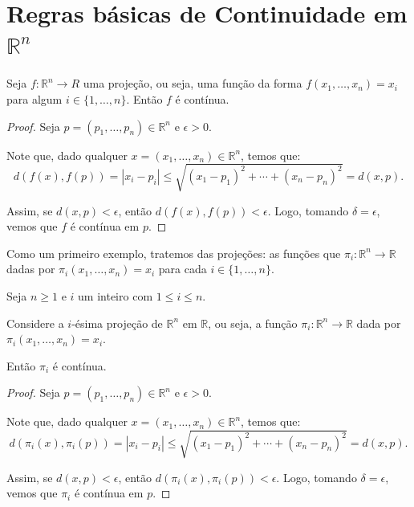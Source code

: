 \section{Regras básicas de Continuidade em $\mathbb R^n$}


\begin{proposition}
    Seja $f: \mathbb R^n\rightarrow R$ uma projeção, ou seja, uma função da forma $f(x_1, \dots, x_n) = x_i$ para algum $i \in \{1, \dots, n\}$.
    Então $f$ é contínua.
\end{proposition}
\begin{proof}
    Seja $p=(p_1, \dots, p_n) \in \mathbb R^n$ e $\epsilon>0$.

    Note que, dado qualquer $x=(x_1, \dots, x_n) \in \mathbb R^n$, temos que:
    \begin{equation*}
        d(f(x), f(p)) = |x_i - p_i| \leq \sqrt{(x_1 - p_1)^2 + \cdots + (x_n - p_n)^2} = d(x, p).
    \end{equation*}

    Assim, se $d(x, p)<\epsilon$, então $d(f(x), f(p))<\epsilon$.
    Logo, tomando $\delta=\epsilon$, vemos que $f$ é contínua em $p$.
\end{proof}

Como um primeiro exemplo, tratemos das projeções: as funções que $\pi_i: \mathbb R^n\rightarrow \mathbb R$ dadas por $\pi_i(x_1, \dots, x_n) = x_i$ para cada $i \in \{1, \dots, n\}$.

\begin{proposition}
    Seja $n\geq 1$ e $i$ um inteiro com $1\leq i\leq n$.
    
    Considere a $i$-ésima projeção de $\mathbb R^n$ em $\mathbb R$, ou seja, a função $\pi_i: \mathbb R^n\rightarrow \mathbb R$ dada por $\pi_i(x_1, \dots, x_n) = x_i$.

    Então $\pi_i$ é contínua.
\end{proposition}
\begin{proof}
    Seja $p=(p_1, \dots, p_n) \in \mathbb R^n$ e $\epsilon>0$.

    Note que, dado qualquer $x=(x_1, \dots, x_n) \in \mathbb R^n$, temos que:
    \begin{equation*}
        d(\pi_i(x), \pi_i(p)) = |x_i - p_i| \leq \sqrt{(x_1 - p_1)^2 + \cdots + (x_n - p_n)^2} = d(x, p).
    \end{equation*}

    Assim, se $d(x, p)<\epsilon$, então $d(\pi_i(x), \pi_i(p))<\epsilon$.
    Logo, tomando $\delta=\epsilon$, vemos que $\pi_i$ é contínua em $p$.
\end{proof}


